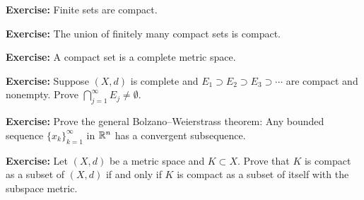 \documentclass[10pt,aspectratio=149]{beamer}
\begin{document}
\begin{frame}

\textbf{Exercise:}
Finite sets are compact.

\pause
\medskip

\textbf{Exercise:}
The union of finitely many compact sets is compact.

\pause
\medskip

\textbf{Exercise:}
A compact set is a complete metric space.

\pause
\medskip

\textbf{Exercise:}
Suppose $(X,d)$ is complete and
$E_1 \supset E_2 \supset E_3 \supset \cdots$ are compact and nonempty.
Prove $\bigcap_{j=1}^\infty E_j \not= \emptyset$.


\pause
\medskip

\textbf{Exercise:}
Prove the general Bolzano--Weierstrass theorem:
Any bounded sequence $\{ x_k \}_{k=1}^\infty$ in ${\mathbb{R}}^n$
has a convergent subsequence.

\pause
\medskip

\textbf{Exercise:}
Let $(X,d)$ be a metric space and $K \subset X$.
Prove that $K$ is compact as a subset of $(X,d)$ if and only if $K$ is
compact as a subset of itself with the subspace metric.

\end{frame}
\end{document}
